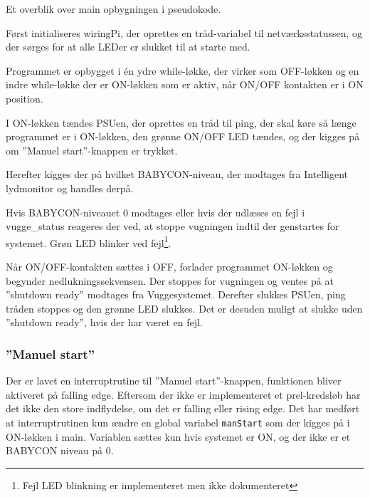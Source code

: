 Et overblik over main opbygningen i pseudokode. 

Først initialiseres wiringPi, der oprettes en tråd-variabel til netværksstatussen, og der sørges for at alle LEDer er slukket til at starte med.  


Programmet er opbygget i én ydre while-løkke, der virker som OFF-løkken og en indre while-løkke der er ON-løkken som er aktiv, når ON/OFF kontakten er i ON position.


I ON-løkken tændes PSUen, der oprettes en tråd til ping, der skal køre så længe programmet er i ON-løkken, den grønne ON/OFF LED  tændes, og der kigges på om ''Manuel start''-knappen er trykket.


Herefter kigges der på hvilket BABYCON-niveau, der modtages fra Intelligent lydmonitor og handles derpå.


Hvis BABYCON-niveauet 0 modtages eller hvis der udlæses en fejl i vugge\_status reageres der ved, at stoppe vugningen indtil der genstartes for systemet. Grøn LED blinker ved fejl\footnote{Fejl LED blinkning er implementeret men ikke dokumenteret}.


Når ON/OFF-kontakten sættes i OFF, forlader programmet ON-løkken og begynder nedlukningssekvensen. Der stoppes for vugningen og ventes på at ''shutdown ready'' modtages fra Vuggesystemet. Derefter slukkes PSUen, ping tråden stoppes og den grønne LED slukkes. Det er desuden muligt at slukke uden ''shutdown ready'', hvis der har været en fejl.  


\subsubsection*{''Manuel start''}

Der er lavet en interruptrutine til ''Manuel start''-knappen, funktionen bliver aktiveret på falling edge. Eftersom der ikke er implementeret et prel-kredsløb har det ikke den store indflydelse, om det er falling eller rising edge. Det har medført at interruptrutinen kun ændre en global variabel \verb+manStart+ som der kigges på i ON-løkken i main. Variablen sættes kun hvis systemet er ON, og der ikke er et BABYCON niveau på 0. 


